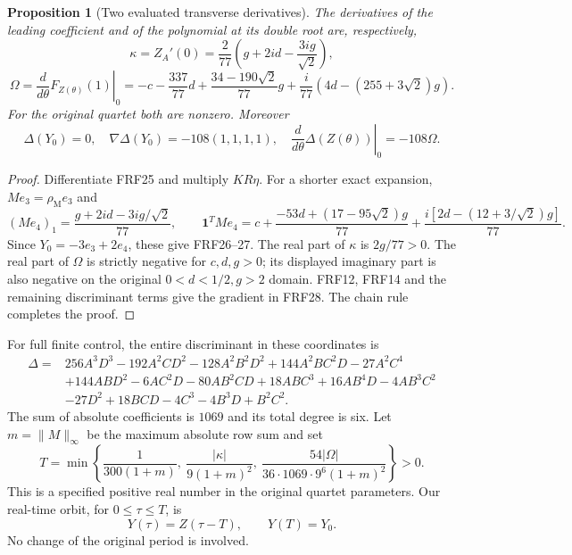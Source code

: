 \documentclass[11pt]{article}
\newtheorem{proposition}[theorem]{Proposition}
\begin{document}
\begin{proposition}[Two evaluated transverse derivatives]\label{prop:transverse}
The derivatives of the leading coefficient and of the polynomial at its
double root are, respectively,
\[
 \kappa=Z_A'(0)=\frac2{77}
       \left(g+2id-\frac{3ig}{\sqrt2}\right),\tag{FRF26}
\]
\[
 \Omega=\left.\frac{d}{d\theta}F_{Z(\theta)}(1)\right|_0
 =-c-\frac{337}{77}d+\frac{34-190\sqrt2}{77}g
       +\frac{i}{77}\left(4d-(255+3\sqrt2)g\right).\tag{FRF27}
\]
For the original quartet both are nonzero. Moreover
\[
 \Delta(Y_0)=0,\quad \nabla\Delta(Y_0)=-108(1,1,1,1),\quad
 \left.\frac{d}{d\theta}\Delta(Z(\theta))\right|_0=-108\Omega.
 \tag{FRF28}
\]
\end{proposition}
\begin{proof}
Differentiate FRF25 and multiply $KR\eta$. For a shorter exact expansion,
$M e_3=\rho_{\mathrm M}e_3$ and
\[
 (M e_4)_1=\frac{g+2id-3ig/\sqrt2}{77},\qquad
 \mathbf1^TM e_4=c+\frac{-53d+(17-95\sqrt2)g}{77}
                 +\frac{i[2d-(12+3/\sqrt2)g]}{77}.
\]
Since $Y_0=-3e_3+2e_4$, these give FRF26--27. The real part of $\kappa$
is $2g/77>0$. The real part of $\Omega$ is strictly negative for $c,d,g>0$;
its displayed imaginary part is also negative on the original
$0<d<1/2,g>2$ domain. FRF12, FRF14 and the remaining discriminant terms
give the gradient in FRF28. The chain rule completes the proof.
\end{proof}

For full finite control, the entire discriminant in these coordinates is
\begin{align*}
\Delta={}&256A^3D^3-192A^2CD^2-128A^2B^2D^2+144A^2BC^2D-27A^2C^4\\
 &+144ABD^2-6AC^2D-80AB^2CD+18ABC^3+16AB^4D-4AB^3C^2\\
 &-27D^2+18BCD-4C^3-4B^3D+B^2C^2.
\end{align*}
The sum of absolute coefficients is $1069$ and its total degree is six.
Let $m=\|M\|_\infty$ be the maximum absolute row sum and set
\[
 \boxed{T=\min\left\{
 \frac1{300(1+m)},\ \frac{|\kappa|}{9(1+m)^2},\
 \frac{54|\Omega|}{36\cdot1069\cdot9^6(1+m)^2}
 \right\}>0.}\tag{FRF29}
\]
This is a specified positive real number in the original quartet parameters.
Our real-time orbit, for $0\le\tau\le T$, is
\[
 Y(\tau)=Z(\tau-T),\qquad Y(T)=Y_0.\tag{FRF30}
\]
No change of the original period is involved.
\end{document}
